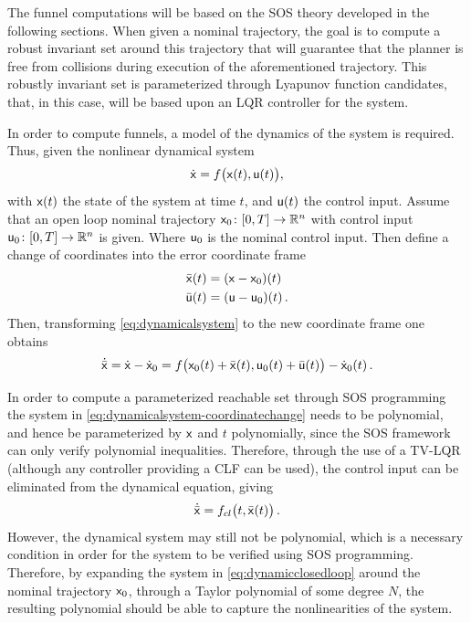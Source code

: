 The funnel computations will be based on the \ac{SOS} theory developed in the
following sections. When given a nominal trajectory, the goal is to compute a
robust invariant set around this trajectory that will guarantee that the planner
is free from collisions during execution of the aforementioned trajectory. This
robustly invariant set is parameterized through Lyapunov function candidates,
that, in this case, will be based upon an \ac{LQR} controller for the system.

In order to compute funnels, a model of the dynamics of the system is required.
Thus, given the nonlinear dynamical system
\begin{equation}
  \dot{{\mathbf{\mathsf{x}}}} = f\big({\mathbf{\mathsf{x}}}(t), {\mathbf{\mathsf{u}}}(t) \big), \label{eq:dynamicalsystem}
\end{equation}
with \({\mathbf{\mathsf{x}}}(t)\) the state of the system at time \(t\), and \({\mathbf{\mathsf{u}}}(t)\)
the control input. Assume that an open loop nominal trajectory \({\mathbf{\mathsf{x}}}_0
\colon [0,T] \rightarrow \mathbb{R}^n\) with control input \({\mathbf{\mathsf{u}}}_0 \colon [0,T]
\rightarrow \mathbb{R}^n\) is given. Where \({\mathbf{\mathsf{u}}}_{0}\) is the nominal control
input. Then define a change of coordinates into the error coordinate frame
\begin{align}
  \label{eq:system-error-dynamics}
  \bar{{\mathbf{\mathsf{x}}}}(t) &= ( {\mathbf{\mathsf{x}}} - {\mathbf{\mathsf{x}}}_0 )(t) \\
  \bar{{\mathbf{\mathsf{u}}}}(t) &= ({\mathbf{\mathsf{u}}} - {\mathbf{\mathsf{u}}}_0 )(t) \, .
\end{align}
Then, transforming \cref{eq:dynamicalsystem} to the new coordinate frame one
obtains
\begin{equation}
  \dot{\bar{{\mathbf{\mathsf{x}}}}} = \dot{{\mathbf{\mathsf{x}}}} - \dot{{\mathbf{\mathsf{x}}}}_0 = f\big( {\mathbf{\mathsf{x}}}_0(t) + \bar{{\mathbf{\mathsf{x}}}}(t), {\mathbf{\mathsf{u}}}_0(t) + \bar{{\mathbf{\mathsf{u}}}}(t) \big) - \dot{{\mathbf{\mathsf{x}}}}_0(t) \, . \label{eq:dynamicalsystem-coordinatechange}
\end{equation}

In order to compute a parameterized reachable set through \ac{SOS} programming
the system in \cref{eq:dynamicalsystem-coordinatechange} needs to be polynomial,
and hence be parameterized by \({\mathbf{\mathsf{x}}}\) and \(t\) polynomially, since the
\ac{SOS} framework can only verify polynomial inequalities. Therefore, through
the use of a \ac{TV-LQR} (although any controller providing a \ac{CLF} can be
used), the control input can be eliminated from the dynamical equation, giving
\begin{equation}
  \label{eq:dynamicclosedloop}
  \dot{\bar{{\mathbf{\mathsf{x}}}}} = f_{cl}\big( t,\bar{{\mathbf{\mathsf{x}}}}(t) \big) \, .
\end{equation}
However, the dynamical system may still not be polynomial, which is a necessary
condition in order for the system to be verified using \ac{SOS} programming.
Therefore, by expanding the system in \cref{eq:dynamicclosedloop} around the
nominal trajectory \({\mathbf{\mathsf{x}}}_0\), through a Taylor polynomial of some degree
\(N\), the resulting polynomial should be able to capture the nonlinearities of
the system.

